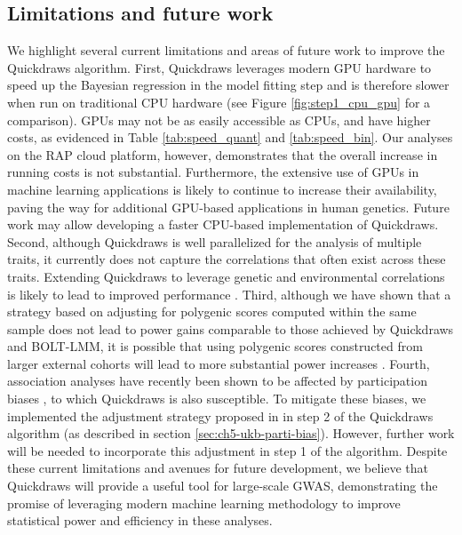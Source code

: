 
\subsection{Limitations and future work}

We highlight several current limitations and areas of future work to improve the Quickdraws algorithm.
%
First, Quickdraws leverages modern GPU hardware to speed up the Bayesian regression in the model fitting step and is therefore slower when run on traditional CPU hardware (see Figure \ref{fig:step1_cpu_gpu} for a comparison).
%
GPUs may not be as easily accessible as CPUs, and have higher costs, as evidenced in Table \ref{tab:speed_quant} and \ref{tab:speed_bin}.
%
Our analyses on the RAP cloud platform, however, demonstrates that the overall increase in running costs is not substantial.
%
Furthermore, the extensive use of GPUs in machine learning applications is likely to continue to increase their availability, paving the way for additional GPU-based applications in human genetics.
%
Future work may allow developing a faster CPU-based implementation of Quickdraws.
%
Second, although Quickdraws is well parallelized for the analysis of multiple traits, it currently does not capture the correlations that often exist across these traits.
%
Extending Quickdraws to leverage genetic and environmental correlations is likely to lead to improved performance \cite{korte2012mixed,zhou2014efficient}.
%
%
Third, although we have shown that a strategy based on adjusting for polygenic scores computed within the same sample does not lead to power gains comparable to those achieved by Quickdraws and BOLT-LMM, it is possible that using polygenic scores constructed from larger external cohorts will lead to more substantial power increases \cite{campos2023boosting, jurgens2023adjusting}.
%
Fourth, association analyses have recently been shown to be affected by participation biases \cite{pirastu2021genetic, benonisdottir2023studying}, to which Quickdraws is also susceptible.
%
To mitigate these biases, we implemented the adjustment strategy proposed in \cite{schoeler2023participation} in step 2 of the Quickdraws algorithm (as described in section \ref{sec:ch5-ukb-parti-bias}).
%
However, further work will be needed to incorporate this adjustment in step 1 of the algorithm.
%
Despite these current limitations and avenues for future development, we believe that Quickdraws will provide a useful tool for large-scale GWAS, demonstrating the promise of leveraging modern machine learning methodology to improve statistical power and efficiency in these analyses.

